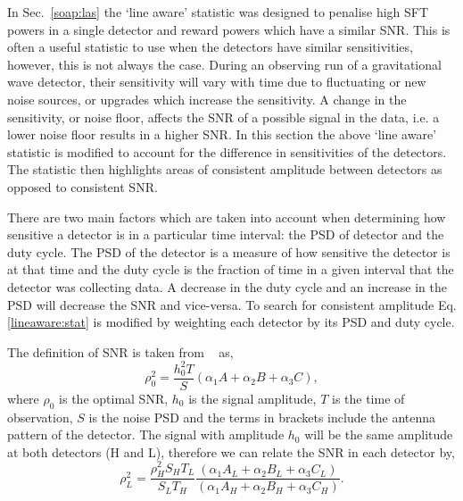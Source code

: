 In Sec.~\ref{soap:las} the `line aware' statistic was designed to penalise high
\gls{SFT} powers in a single detector and reward powers which have a similar
\gls{SNR}. This is often a useful statistic to use when the detectors have
similar sensitivities, however, this is not always the case. During an
observing run of a gravitational wave detector, their sensitivity will vary
with time due to fluctuating or new noise sources, or upgrades which increase the sensitivity. 
A change in the sensitivity, or noise floor,
affects the \gls{SNR} of a possible signal in the data, i.e. a lower noise
floor results in a higher \gls{SNR}.  In this section the above `line aware'
statistic is modified to account for the difference in sensitivities of the
detectors.
The statistic then highlights areas of consistent amplitude between detectors as
opposed to consistent \gls{SNR}.

There are two main factors which are taken into account when determining how
sensitive a detector is in a particular time interval: the \gls{PSD} of
detector and the duty cycle. The \gls{PSD} of the detector is a measure of how
sensitive the detector is at that time and the duty cycle is the fraction of
time in a given interval that the detector was collecting data. A decrease in
the duty cycle and an increase in the \gls{PSD} will decrease the \gls{SNR} and
vice-versa. To search for consistent amplitude Eq.\ref{lineaware:stat} is
modified by weighting each detector by its \gls{PSD} and duty cycle.

The definition of \gls{SNR} is taken from \citep{}~ as, 
\begin{equation}
    \rho_0^2 = \frac{h_0^2 T}{S}(\alpha_1A + \alpha_2B + \alpha_3C),
\end{equation}
where $\rho_0$ is the optimal \gls{SNR}, $h_0$ is the signal amplitude, $T$ is
the time of observation, $S$ is the noise \gls{PSD} and the terms in brackets include the antenna pattern of the detector. 
The signal with amplitude $h_0$ will be the same amplitude at both detectors (H and L), therefore we can relate the \gls{SNR} in each detector by,
\begin{equation}
\label{lineawareamp:snrequate}
    \rho_L^2 = \frac{\rho_H^2 S_H T_L}{S_L T_H} \frac{(\alpha_1A_L + \alpha_2B_L + \alpha_3C_L)}{(\alpha_1A_H + \alpha_2B_H + \alpha_3C_H)} .
\end{equation}

